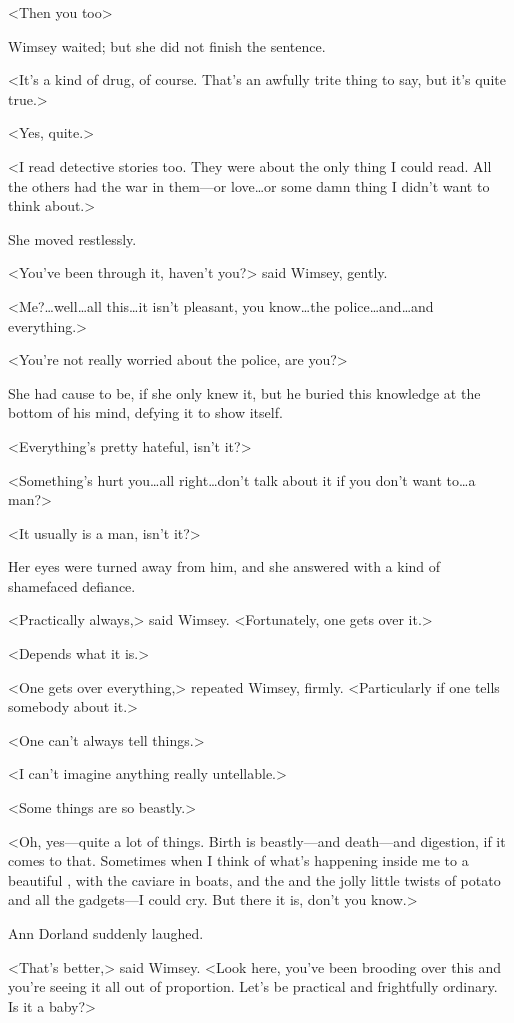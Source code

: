 <Then you too\longdots>

Wimsey waited; but she did not finish the sentence.

<It's a kind of drug, of course. That's an awfully trite thing to say, but it's quite true.>

<Yes, quite.>

<I read detective stories too. They were about the only thing I could read. All the others had the war in them—or love\dots  or some damn thing I didn't want to think about.>

She moved restlessly.

<You've been through it, haven't you?> said Wimsey, gently.

<Me?\dots well\dots  all this\dots  it isn't pleasant, you know\dots  the police\dots  and\dots  and everything.>

<You're not really worried about the police, are you?>

She had cause to be, if she only knew it, but he buried this knowledge at the bottom of his mind, defying it to show itself.

<Everything's pretty hateful, isn't it?>

<Something's hurt you\dots  all right\dots  don't talk about it if you don't want to\dots  a man?>

<It usually is a man, isn't it?>

Her eyes were turned away from him, and she answered with a kind of shamefaced defiance.

<Practically always,> said Wimsey. <Fortunately, one gets over it.>

<Depends what it is.>

<One gets over everything,> repeated Wimsey, firmly. <Particularly if one tells somebody about it.>

<One can't always tell things.>

<I can't imagine anything really untellable.>

<Some things are so beastly.>

<Oh, yes—quite a lot of things. Birth is beastly—and death—and digestion, if it comes to that. Sometimes when I think of what's happening inside me to a beautiful , with the caviare in boats, and the  and the jolly little twists of potato and all the gadgets—I could cry. But there it is, don't you know.>

Ann Dorland suddenly laughed.

<That's better,> said Wimsey. <Look here, you've been brooding over this and you're seeing it all out of proportion. Let's be practical and frightfully ordinary. Is it a baby?>

